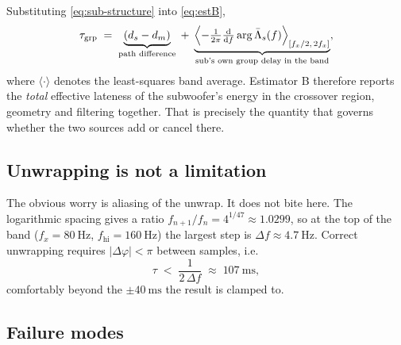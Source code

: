 \documentclass[11pt,a4paper]{article}
\begin{document}
Substituting \eqref{eq:sub-structure} into \eqref{eq:estB},
%
\begin{equation}
  \tau_{\mathrm{grp}}
  \;=\; \underbrace{(d_s - d_m)}_{\text{path difference}}
  \;+\; \underbrace{\Bigl\langle -\tfrac{1}{2\pi}\tfrac{\mathrm{d}}{\mathrm{d}f}\arg \bar\Lambda_s(f) \Bigr\rangle_{[f_x/2,\,2f_x]}}_{\text{sub's own group delay in the band}},
  \label{eq:B-decomp}
\end{equation}
%
where $\langle\cdot\rangle$ denotes the least-squares band average. Estimator B
therefore reports the \emph{total} effective lateness of the subwoofer's energy
in the crossover region, geometry and filtering together. That is precisely the
quantity that governs whether the two sources add or cancel there.

\subsection{Unwrapping is not a limitation}

The obvious worry is aliasing of the unwrap. It does not bite here. The
logarithmic spacing gives a ratio $f_{n+1}/f_n = 4^{1/47} \approx 1.0299$, so at
the top of the band ($f_x = \SI{80}{\hertz}$, $f_{\mathrm{hi}} =
\SI{160}{\hertz}$) the largest step is $\Delta f \approx \SI{4.7}{\hertz}$.
Correct unwrapping requires $|\Delta\varphi| < \pi$ between samples, i.e.
%
\begin{equation}
  \tau \;<\; \frac{1}{2\,\Delta f} \;\approx\; \SI{107}{\milli\second},
\end{equation}
%
comfortably beyond the $\pm\SI{40}{\milli\second}$ the result is clamped to.

\subsection{Failure modes}
\label{sec:B-failure}
\end{document}
